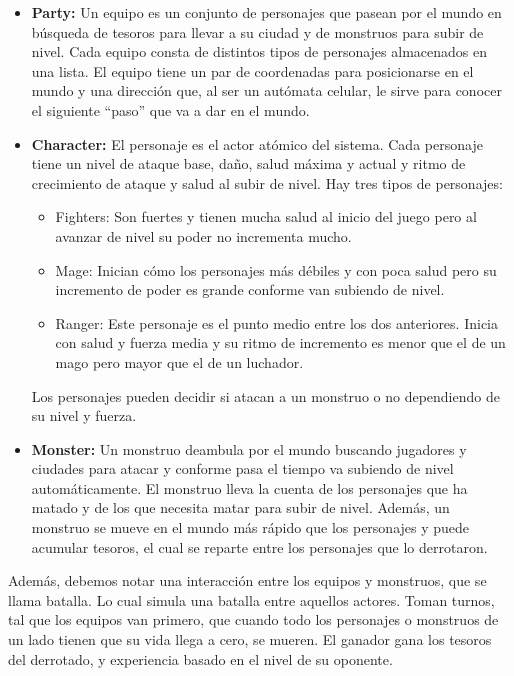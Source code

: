 {{\begin{itemize}
{            cuándo salen a buscar tesoros.
        }
        \item{\textbf{Party: }Un equipo es un conjunto de personajes que pasean
            por el mundo en búsqueda de tesoros para llevar a su ciudad y de
            monstruos para subir de nivel. Cada equipo consta de distintos
            tipos de personajes almacenados en una lista. El equipo tiene un par
            de coordenadas para posicionarse en el mundo y una dirección que, al
            ser un autómata celular, le sirve para conocer el siguiente ``paso''
            que va a dar en el mundo.
        }
        \item{\textbf{Character: }El personaje es el actor atómico del sistema.
            Cada personaje tiene un nivel de ataque base, daño, salud máxima y
            actual y ritmo de crecimiento de ataque y salud al subir de nivel.
            Hay tres tipos de personajes:
            \begin{itemize}
            \item{Fighters: Son fuertes y tienen mucha salud al inicio del
                juego pero al avanzar de nivel su poder no incrementa mucho.
            }
            \item{Mage: Inician cómo los personajes más débiles y con poca
                salud pero su incremento de poder es grande conforme van
                subiendo de nivel.
            }
            \item{Ranger: Este personaje es el punto medio entre los dos
                anteriores. Inicia con salud y fuerza media y su ritmo de
                incremento es menor que el de un mago pero mayor que el de un
                luchador.
            }
            \end{itemize}
            Los personajes pueden decidir si atacan a un monstruo o no
            dependiendo de su nivel y fuerza.
        }
        \item{\textbf{Monster: }Un monstruo deambula por el mundo buscando
            jugadores y ciudades para atacar y conforme pasa el tiempo va
            subiendo de nivel automáticamente. El monstruo lleva la cuenta de
            los personajes que ha matado y de los que necesita matar para subir
            de nivel. Además, un monstruo se mueve en el mundo más rápido que
            los personajes y puede acumular tesoros, el cual se reparte entre
            los personajes que lo derrotaron.
        }
        \end{itemize}
        Además, debemos notar una interacción entre los equipos y monstruos, que
        se llama batalla. Lo cual simula una batalla entre aquellos actores.
        Toman turnos, tal que los equipos van primero, que cuando todo los
        personajes o monstruos de un lado tienen que su vida llega a cero,
        se mueren. El ganador gana los tesoros del derrotado, y experiencia
        basado en el nivel de su oponente.\\
        
}}
